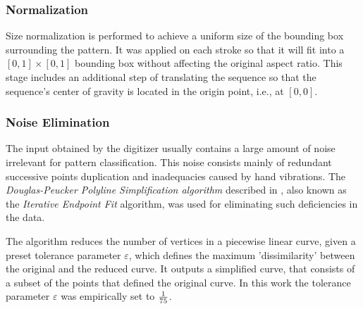 \documentclass[10pt, conference, compsocconf]{IEEEtran}
\theoremstyle{definition}
\begin{document}
\subsubsection{Normalization}
Size normalization is performed to achieve a uniform size of the bounding box surrounding the pattern. 
It was applied on each stroke so that it will fit into a $[0,1]\times[0,1]$ bounding box without affecting the original aspect ratio. 
This stage includes an additional step of translating the sequence so that the sequence's center of gravity is located in the origin point, i.e., at $[0,0]$.
%

\subsubsection{Noise Elimination}

The input obtained by the digitizer usually contains a large amount of noise irrelevant for pattern classification. 
This noise consists mainly of redundant successive points duplication and inadequacies caused by hand vibrations. 
The \emph{Douglas-Peucker Polyline Simplification algorithm} described in \cite{douglas1973algorithms}, also known as the \emph{Iterative Endpoint Fit} algorithm, was used for eliminating such deficiencies in the data. 

The algorithm reduces the number of vertices in a piecewise linear curve, given a preset tolerance parameter $\varepsilon$, which defines the maximum 'dissimilarity' between the original and the reduced curve.
It outputs a simplified curve, that consists of a subset of the points that defined the original curve.
In this work the tolerance parameter $\varepsilon$ was empirically set to ${1 \over 75}$.
\end{document}
